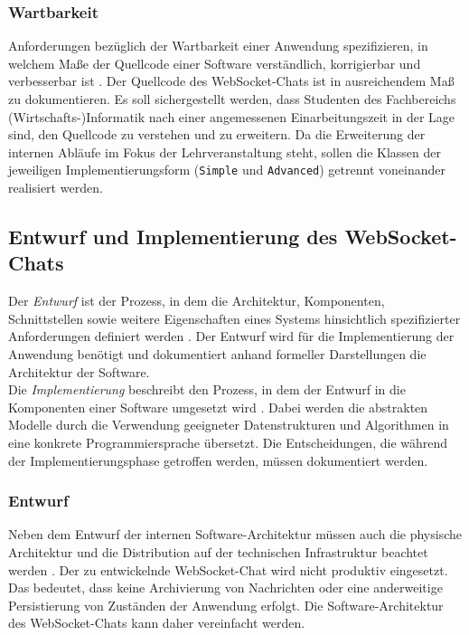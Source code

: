 \documentclass[11pt,a4paper,titlepage]{scrartcl}
\numberwithin{equation}{section}
\begin{document}
\subsubsection*{Wartbarkeit}
Anforderungen bezüglich der Wartbarkeit einer Anwendung spezifizieren, in welchem Maße der Quellcode einer Software verständlich, korrigierbar und verbesserbar ist \autocite[315]{mairiza_investigation_2010}. Der Quellcode des WebSocket-Chats ist in ausreichendem Maß zu dokumentieren. Es soll sichergestellt werden, dass Studenten des Fachbereichs (Wirtschafts-)Informatik nach einer angemessenen Einarbeitungszeit in der Lage sind, den Quellcode zu verstehen und zu erweitern. Da die Erweiterung der internen Abläufe im Fokus der Lehrveranstaltung steht, sollen die Klassen der jeweiligen Implementierungsform (\texttt{Simple} und \texttt{Advanced}) getrennt voneinander realisiert werden.
\subsection{Entwurf und Implementierung des WebSocket-Chats}
Der \textit{Entwurf} ist der Prozess, in dem die Architektur, Komponenten, Schnittstellen sowie weitere Eigenschaften eines Systems hinsichtlich spezifizierter Anforderungen definiert werden \autocite[25]{insitute_of_electrical_and_electronics_engineers_ieee_1990}. Der Entwurf wird für die Implementierung der Anwendung benötigt und dokumentiert anhand formeller Darstellungen die Architektur der Software. \\

\noindent Die \textit{Implementierung} beschreibt den Prozess, in dem der Entwurf in die Komponenten einer Software umgesetzt wird \autocite[38]{insitute_of_electrical_and_electronics_engineers_ieee_1990}. Dabei werden die abstrakten Modelle durch die Verwendung geeigneter Datenstrukturen und Algorithmen in eine konkrete Programmiersprache übersetzt. Die Entscheidungen, die während der Implementierungsphase getroffen werden, müssen dokumentiert werden.
\subsubsection{Entwurf}
Neben dem Entwurf der internen Software-Architektur müssen auch die physische Architektur und die Distribution auf der technischen Infrastruktur beachtet werden \autocite[6]{balzert_lehrbuch_2011}. Der zu entwickelnde WebSocket-Chat wird nicht produktiv eingesetzt. Das bedeutet, dass keine Archivierung von Nachrichten oder eine anderweitige Persistierung von Zuständen der Anwendung erfolgt. Die Software-Architektur des WebSocket-Chats kann daher vereinfacht werden. \\
\end{document}
